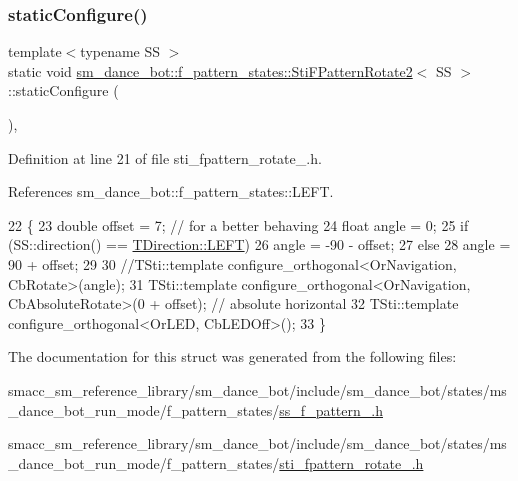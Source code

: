 \subsubsection{\texorpdfstring{static\+Configure()}{staticConfigure()}}
{\footnotesize\ttfamily template$<$typename SS $>$ \\
static void \hyperlink{classsm__dance__bot_1_1f__pattern__states_1_1StiFPatternRotate2}{sm\+\_\+dance\+\_\+bot\+::f\+\_\+pattern\+\_\+states\+::\+Sti\+F\+Pattern\+Rotate2}$<$ SS $>$\+::static\+Configure (\begin{DoxyParamCaption}{ }\end{DoxyParamCaption})\hspace{0.3cm}{\ttfamily [inline]}, {\ttfamily [static]}}



Definition at line 21 of file sti\+\_\+fpattern\+\_\+rotate\+\_.\+h.



References sm\+\_\+dance\+\_\+bot\+::f\+\_\+pattern\+\_\+states\+::\+L\+E\+FT.


\begin{DoxyCode}
22   \{
23     \textcolor{keywordtype}{double} offset = 7; \textcolor{comment}{// for a better behaving}
24     \textcolor{keywordtype}{float} angle = 0;
25     \textcolor{keywordflow}{if} (SS::direction() == \hyperlink{namespacesm__dance__bot_1_1f__pattern__states_acc99b72745466e5dcee9272425a34e58a684d325a7303f52e64011467ff5c5758}{TDirection::LEFT})
26       angle = -90 - offset;
27     \textcolor{keywordflow}{else}
28       angle = 90 + offset;
29 
30     \textcolor{comment}{//TSti::template configure\_orthogonal<OrNavigation, CbRotate>(angle);}
31     TSti::template configure\_orthogonal<OrNavigation, CbAbsoluteRotate>(0 + offset); \textcolor{comment}{// absolute horizontal}
32     TSti::template configure\_orthogonal<OrLED, CbLEDOff>();
33   \}
\end{DoxyCode}


The documentation for this struct was generated from the following files\+:\begin{DoxyCompactItemize}
\item 
smacc\+\_\+sm\+\_\+reference\+\_\+library/sm\+\_\+dance\+\_\+bot/include/sm\+\_\+dance\+\_\+bot/states/ms\+\_\+dance\+\_\+bot\+\_\+run\+\_\+mode/f\+\_\+pattern\+\_\+states/\hyperlink{include_2sm__dance__bot_2states_2ms__dance__bot__run__mode_2f__pattern__states_2ss__f__pattern__1_8h}{ss\+\_\+f\+\_\+pattern\+\_.\+h}\item 
smacc\+\_\+sm\+\_\+reference\+\_\+library/sm\+\_\+dance\+\_\+bot/include/sm\+\_\+dance\+\_\+bot/states/ms\+\_\+dance\+\_\+bot\+\_\+run\+\_\+mode/f\+\_\+pattern\+\_\+states/\hyperlink{include_2sm__dance__bot_2states_2ms__dance__bot__run__mode_2f__pattern__states_2sti__fpattern__rotate__2_8h}{sti\+\_\+fpattern\+\_\+rotate\+\_.\+h}\end{DoxyCompactItemize}
